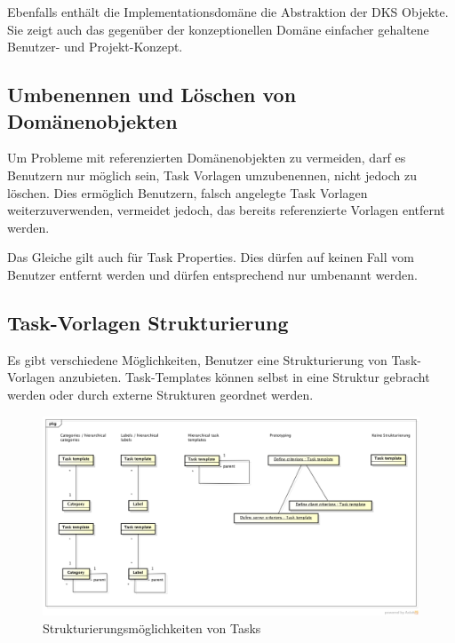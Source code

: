 			Ebenfalls enthält die Implementationsdomäne die Abstraktion der DKS Objekte.
			Sie zeigt auch das gegenüber der konzeptionellen Domäne einfacher gehaltene Benutzer- und Projekt-Konzept.
			
			
		\subsection{Umbenennen und Löschen von Domänenobjekten}
			Um Probleme mit referenzierten Domänenobjekten zu vermeiden,
			darf es Benutzern nur möglich sein, Task Vorlagen umzubenennen,
			nicht jedoch zu löschen.
			Dies ermöglich Benutzern, 
			falsch angelegte Task Vorlagen weiterzuverwenden, vermeidet jedoch, 
			das bereits referenzierte Vorlagen entfernt werden.
			
			Das Gleiche gilt auch für Task Properties.
			Dies dürfen auf keinen Fall vom Benutzer entfernt werden 
			und dürfen entsprechend nur umbenannt werden.
			
		
		\subsection{Task-Vorlagen Strukturierung}
			Es gibt verschiedene Möglichkeiten, 
			Benutzer eine Strukturierung von Task-Vorlagen anzubieten.
			Task-Templates können selbst in eine Struktur gebracht werden
			oder durch externe Strukturen geordnet werden.
		
			\begin{figure}[H]
				\includegraphics[width=\textwidth]{architecture/media/img/taskTemplateStructure.png}
				\centering
				\caption{Strukturierungsmöglichkeiten von Tasks}
				\label{fig:taskTemplateStructure}
			\end{figure}
			
